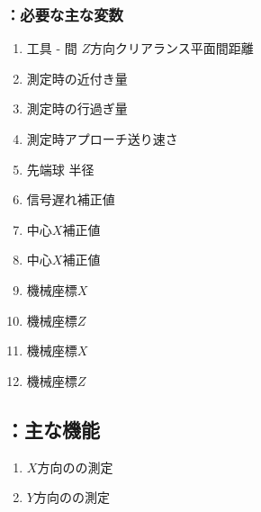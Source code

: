 \subsubsection{\MCenterline：必要な主な変数}
\begin{enumerate}[label*=\sarrow]
\item 工具 - \EndFace 間 $Z$方向クリアランス平面間距離
\item \TouchSensorProbe 測定時の近付き量
\item \TouchSensorProbe 測定時の行過ぎ量
\item \TouchSensorProbe 測定時アプローチ送り速さ
\item \TouchSensorProbe 先端球 半径
\item \TouchSensorProbe 信号遅れ補正値
\item \TouchSensorProbe 中心$X$補正値
\item \TouchSensorProbe 中心$X$補正値
\item \NoOnePalette{} \JigCenter 機械座標$X$
\item \NoOnePalette{} \JigCenter 機械座標$Z$
\item \NoTwoPalette{} \JigCenter 機械座標$X$
\item \NoTwoPalette{} \JigCenter 機械座標$Z$
\end{enumerate}


\subsection{\MCenterline：主な機能}
\begin{enumerate}[label*=\sarrow]
\item $X$方向の\CenterlineEndFaceDif の測定
\item $Y$方向の\CenterlineEndFaceDif の測定
\end{enumerate}


